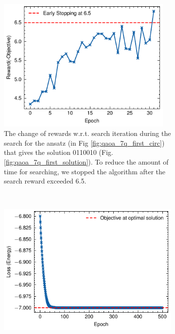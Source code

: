 \documentclass[a4paper,onecolumn,11pt]{quantumarticle}
\begin{document}

\begin{figure}[H]
    \centering
    \begin{subfigure}[t]{0.48\textwidth}
        \includegraphics[width=0.95\textwidth]{Figures/fig_qaoa_7q_1_search_rewards.pdf}
        \caption{The change of rewards w.r.t. search iteration during the search for the ansatz (in Fig \ref{fig:qaoa_7q_first_circ}) that gives the solution 0110010 (Fig. \ref{fig:qaoa_7q_first_solution}). To reduce the amount of time for searching, we stopped the algorithm after the search reward exceeded 6.5.}
        \label{fig:qaoa_search_reward_1}
    \end{subfigure}
    ~
    \begin{subfigure}[t]{0.48\textwidth}
        \includegraphics[width=\textwidth]{Figures/fig_qaoa_7q_1_fine_tune_loss.pdf}

\end{subfigure}
\end{figure}
\end{document}
